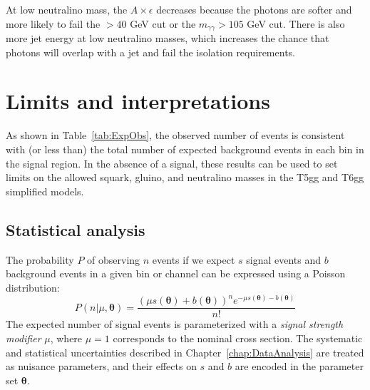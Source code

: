 
At low neutralino mass, the $A \times \epsilon$ decreases because the photons are softer and more likely to fail the \pT $> 40$ GeV cut or the 
$m_{\gamma\gamma} > 105$ GeV cut.
There is also more jet energy at low neutralino masses, which increases the chance that photons will overlap with a jet and fail the 
isolation requirements.



\section{Limits and interpretations}
\label{sec:limits}

As shown in Table~\ref{tab:ExpObs}, the observed number of events is consistent with (or less than) the total number of 
expected background events in each bin in the signal region. In the absence of a signal, these results can 
be used to set limits on the allowed squark, gluino, and neutralino masses in the T5gg and T6gg simplified models.

\subsection{Statistical analysis}
\label{sec:stats}

The probability $P$ of observing $n$ events if we expect $s$ signal events and $b$ background events
in a given bin or channel
can be expressed using a Poisson distribution:
\begin{equation}
P(n|\mu, \bm{\theta}) = \frac{(\mu s(\bm{\theta})+b(\bm{\theta}))^ne^{-\mu s(\bm{\theta})-b(\bm{\theta})}}{n!}
\end{equation}
The expected number of signal events is parameterized with a \textit{signal strength modifier} $\mu$, where $\mu = 1$ 
corresponds to the  nominal cross section. The systematic and statistical uncertainties described in 
Chapter~\ref{chap:DataAnalysis} are treated as nuisance parameters,
and their effects on $s$ and $b$ are encoded in the parameter set $\bm{\theta}$.

